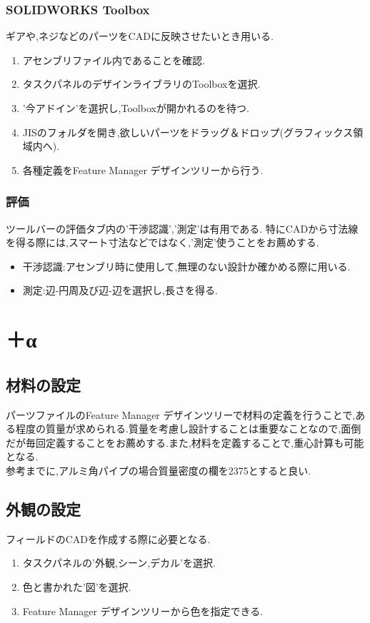 \documentclass[a4paper,11pt]{jsarticle}
\begin{document}
\subsubsection{SOLIDWORKS Toolbox}
ギアや,ネジなどのパーツをCADに反映させたいとき用いる.
\begin{enumerate}
 \item アセンブリファイル内であることを確認.
 \item タスクパネルのデザインライブラリのToolboxを選択.
 \item '今アドイン'を選択し,Toolboxが開かれるのを待つ.
 \item JISのフォルダを開き,欲しいパーツをドラッグ＆ドロップ(グラフィックス領域内へ).
 \item 各種定義をFeature Manager デザインツリーから行う.
\end{enumerate}
\subsubsection{評価}
ツールバーの評価タブ内の'干渉認識','測定'は有用である.
特にCADから寸法線を得る際には,スマート寸法などではなく,'測定'使うことをお薦めする.
\begin{itemize}
 \item 干渉認識:アセンブリ時に使用して,無理のない設計か確かめる際に用いる.
 \item 測定:辺-円周及び辺-辺を選択し,長さを得る.
\end{itemize}
\section{＋α}
\subsection{材料の設定}
パーツファイルのFeature Manager デザインツリーで材料の定義を行うことで,ある程度の質量が求められる.質量を考慮し設計することは重要なことなので,面倒だが毎回定義することをお薦めする.また,材料を定義することで,重心計算も可能となる.\\
参考までに,アルミ角パイプの場合質量密度の欄を2375とすると良い.
\subsection{外観の設定}
フィールドのCADを作成する際に必要となる.
\begin{enumerate}
 \item タスクパネルの'外観,シーン,デカル'を選択.
 \item 色と書かれた'図'を選択.
 \item Feature Manager デザインツリーから色を指定できる.
\end{enumerate}
\end{document}
